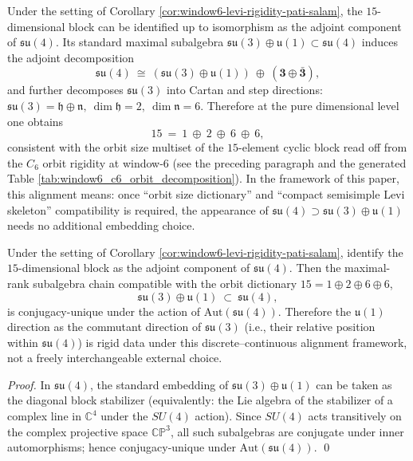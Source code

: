 \begin{remark}[\texorpdfstring{$15=1\oplus 2\oplus 6\oplus 6$}{15=1+2+6+6} orbit dictionary and the non-external alignment of \texorpdfstring{$\mathfrak{su}(4)\supset\mathfrak{su}(3)\oplus\mathfrak u(1)$}{su4 contains su3+u1}]\label{rem:window6-su4-su3u1-orbit-dictionary}
Under the setting of Corollary \ref{cor:window6-levi-rigidity-pati-salam}, the \(15\)-dimensional block can be identified up to isomorphism as the adjoint component of \(\mathfrak{su}(4)\).
Its standard maximal subalgebra \(\mathfrak{su}(3)\oplus\mathfrak u(1)\subset\mathfrak{su}(4)\) induces the adjoint decomposition
\[
\mathfrak{su}(4)\ \cong\ (\mathfrak{su}(3)\oplus\mathfrak u(1))\ \oplus\ (\mathbf3\oplus\bar{\mathbf3}),
\]
and further decomposes \(\mathfrak{su}(3)\) into Cartan and step directions:
\(
\mathfrak{su}(3)=\mathfrak h\oplus\mathfrak n,\ \dim\mathfrak h=2,\ \dim\mathfrak n=6
\).
Therefore at the pure dimensional level one obtains
\[
15\ =\ 1\ \oplus\ 2\ \oplus\ 6\ \oplus\ 6,
\]
consistent with the orbit size multiset of the \(15\)-element cyclic block read off from the \(C_6\) orbit rigidity at window-\(6\) (see the preceding paragraph and the generated Table \ref{tab:window6_c6_orbit_decomposition}).
In the framework of this paper, this alignment means: once ``orbit size dictionary'' and ``compact semisimple Levi skeleton'' compatibility is required, the appearance of \(\mathfrak{su}(4)\supset\mathfrak{su}(3)\oplus\mathfrak u(1)\) needs no additional embedding choice.
\end{remark}

\begin{corollary}\label{cor:window6-su4-embedding-rigidity}
Under the setting of Corollary \ref{cor:window6-levi-rigidity-pati-salam}, identify the \(15\)-dimensional block as the adjoint component of \(\mathfrak{su}(4)\).
Then the maximal-rank subalgebra chain compatible with the orbit dictionary \(15=1\oplus 2\oplus 6\oplus 6\),
\[
\mathfrak{su}(3)\oplus\mathfrak u(1)\ \subset\ \mathfrak{su}(4),
\]
is conjugacy-unique under the action of \(\mathrm{Aut}(\mathfrak{su}(4))\).
Therefore the \(\mathfrak u(1)\) direction as the commutant direction of \(\mathfrak{su}(3)\) (i.e., their relative position within \(\mathfrak{su}(4)\)) is rigid data under this discrete--continuous alignment framework, not a freely interchangeable external choice.
\end{corollary}
\begin{proof}
In \(\mathfrak{su}(4)\), the standard embedding of \(\mathfrak{su}(3)\oplus\mathfrak u(1)\) can be taken as the diagonal block stabilizer (equivalently: the Lie algebra of the stabilizer of a complex line in \(\mathbb{C}^4\) under the \(SU(4)\) action).
Since \(SU(4)\) acts transitively on the complex projective space \(\mathbb{CP}^3\), all such subalgebras are conjugate under inner automorphisms; hence conjugacy-unique under \(\mathrm{Aut}(\mathfrak{su}(4))\). \qed
\end{proof}

